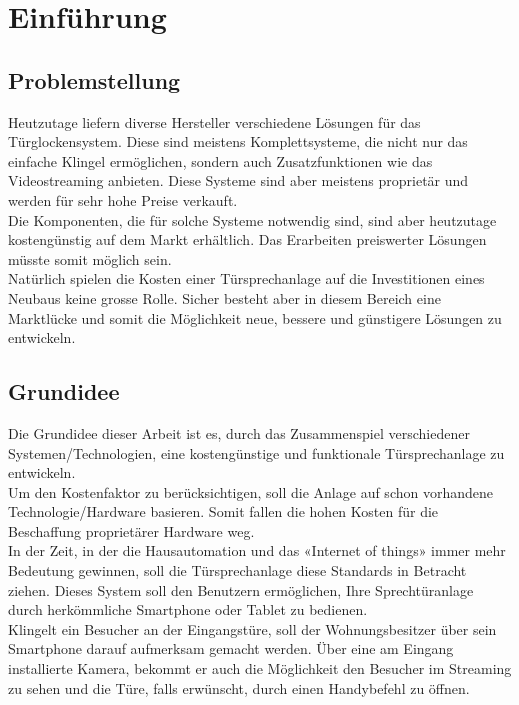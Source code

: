 \section{Einführung}
\label{sec:chapterexample}

\subsection{Problemstellung}
\label{sec:chapterexample}

Heutzutage liefern diverse Hersteller verschiedene Lösungen für das Türglockensystem. Diese sind meistens Komplettsysteme, die nicht nur das einfache Klingel ermöglichen, sondern auch Zusatzfunktionen wie das Videostreaming anbieten. Diese Systeme sind aber meistens proprietär und werden für sehr hohe Preise verkauft.
\\
Die Komponenten, die für solche Systeme notwendig sind, sind aber heutzutage kostengünstig auf dem Markt erhältlich. Das Erarbeiten preiswerter Lösungen müsste somit möglich sein. 
\\
Natürlich spielen die Kosten einer Türsprechanlage auf die Investitionen eines Neubaus keine grosse Rolle. Sicher besteht aber in diesem Bereich eine Marktlücke und somit die Möglichkeit neue, bessere und günstigere Lösungen zu entwickeln.  

\subsection{Grundidee}
\label{sec:grundidee}

Die Grundidee dieser Arbeit ist es, durch das Zusammenspiel verschiedener Systemen/Technologien, eine kostengünstige und funktionale Türsprechanlage zu entwickeln.
\\ 
Um den Kostenfaktor zu berücksichtigen, soll die Anlage auf schon vorhandene Technologie/Hardware basieren. Somit fallen die hohen Kosten für die Beschaffung proprietärer Hardware weg.
\\
In der Zeit, in der die Hausautomation und das «Internet of things» immer mehr Bedeutung gewinnen, soll die Türsprechanlage diese Standards in Betracht ziehen.   
Dieses System soll den Benutzern ermöglichen, Ihre Sprechtüranlage durch herkömmliche Smartphone oder Tablet zu bedienen.
\\
Klingelt ein Besucher an der Eingangstüre, soll der Wohnungsbesitzer über sein Smartphone darauf aufmerksam gemacht werden. Über eine am Eingang installierte Kamera, bekommt er auch die Möglichkeit den Besucher im Streaming zu sehen und die Türe, falls erwünscht, durch einen Handybefehl zu öffnen.

